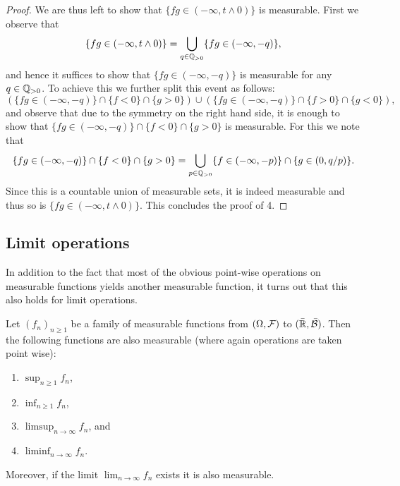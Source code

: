 \begin{proof}
We are thus left to show that $\{fg \in (-\infty, t \wedge 0)\}$ is measurable. First we observe that
\[
	\{fg \in (-\infty, t \wedge 0)\} = \bigcup_{q \in \mathbb Q_{>0}} \{fg \in (-\infty,-q)\},
\]
and hence it suffices to show that $\{fg \in (-\infty,-q)\}$ is measurable for any $q \in \mathbb Q_{>0}$. To achieve this we further split this event as follows:
\[
	\left(\{fg \in (-\infty,-q)\} \cap \{f < 0\} \cap \{g > 0\}\right) 
	\cup \left(\{fg \in (-\infty,-q)\} \cap \{f > 0\} \cap \{g < 0\}\right),
\]
and observe that due to the symmetry on the right hand side, it is enough to show that $\{fg \in (-\infty,-q)\} \cap \{f < 0\} \cap \{g > 0\}$ is measurable. For this we note that
\[
	\{fg \in (-\infty,-q)\} \cap \{f < 0\} \cap \{g > 0\} 
	= \bigcup_{p \in \mathbb Q_{>0}} \{f \in (-\infty, -p)\} \cap \{g \in (0, q/p)\}.
\]
Since this is a countable union of measurable sets, it is indeed measurable and thus so is $\{fg \in (-\infty, t \wedge 0)\}$. This concludes the proof of 4.
\end{proof}

\subsection{Limit operations}

In addition to the fact that most of the obvious point-wise operations on measurable functions yields another measurable function, it turns out that this also holds for limit operations. 

\begin{lemma}\label{lem:limit_operations_measurable_functions}
Let $(f_n)_{n \ge 1}$ be a family of measurable functions from $(\Omega, \mathcal F)$ to  $(\bar{\mathbb R}, \bar{\mathcal B})$. Then the following functions are also measurable (where again operations are taken point wise):
\begin{enumerate}
\item $\sup_{n \ge 1} f_n$,
\item $\inf_{n \ge 1} f_n$,
\item $\limsup_{n \to \infty} f_n$, and
\item $\liminf_{n \to \infty} f_n$.
\end{enumerate}

Moreover, if the limit $\lim_{n \to \infty} f_n$ exists it is also measurable. 
\end{lemma}

